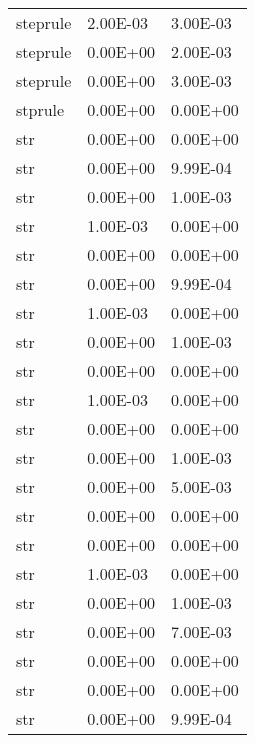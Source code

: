 \begin{appendices}
\begin{center}
\begin{longtable}{|l|l|l|}
steprule                      & 2.00E-03      & 3.00E-03        \\
steprule                      & 0.00E+00      & 2.00E-03        \\
steprule                      & 0.00E+00      & 3.00E-03        \\
stprule                       & 0.00E+00      & 0.00E+00        \\
str                           & 0.00E+00      & 0.00E+00        \\
str                           & 0.00E+00      & 9.99E-04        \\
str                           & 0.00E+00      & 1.00E-03        \\
str                           & 1.00E-03      & 0.00E+00        \\
str                           & 0.00E+00      & 0.00E+00        \\
str                           & 0.00E+00      & 9.99E-04        \\
str                           & 1.00E-03      & 0.00E+00        \\
str                           & 0.00E+00      & 1.00E-03        \\
str                           & 0.00E+00      & 0.00E+00        \\
str                           & 1.00E-03      & 0.00E+00        \\
str                           & 0.00E+00      & 0.00E+00        \\
str                           & 0.00E+00      & 1.00E-03        \\
str                           & 0.00E+00      & 5.00E-03        \\
str                           & 0.00E+00      & 0.00E+00        \\
str                           & 0.00E+00      & 0.00E+00        \\
str                           & 1.00E-03      & 0.00E+00        \\
str                           & 0.00E+00      & 1.00E-03        \\
str                           & 0.00E+00      & 7.00E-03        \\
str                           & 0.00E+00      & 0.00E+00        \\
str                           & 0.00E+00      & 0.00E+00        \\
str                           & 0.00E+00      & 9.99E-04        \\

\end{longtable}
\end{center}
\end{appendices}
